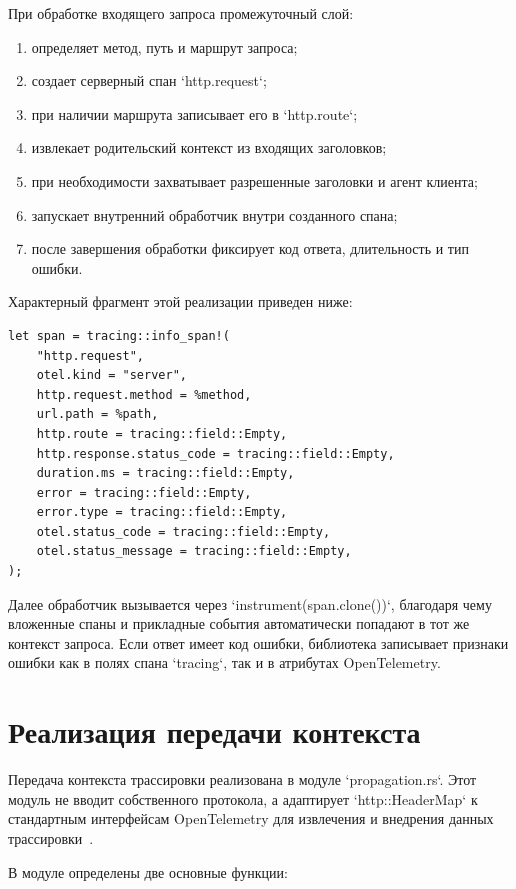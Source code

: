 При обработке входящего запроса промежуточный слой:
\begin{enumerate}
    \item определяет метод, путь и маршрут запроса;
    \item создает серверный спан `http.request`;
    \item при наличии маршрута записывает его в `http.route`;
    \item извлекает родительский контекст из входящих заголовков;
    \item при необходимости захватывает разрешенные заголовки и агент клиента;
    \item запускает внутренний обработчик внутри созданного спана;
    \item после завершения обработки фиксирует код ответа, длительность и тип
    ошибки.
\end{enumerate}

Характерный фрагмент этой реализации приведен ниже:

\begin{verbatim}
let span = tracing::info_span!(
    "http.request",
    otel.kind = "server",
    http.request.method = %method,
    url.path = %path,
    http.route = tracing::field::Empty,
    http.response.status_code = tracing::field::Empty,
    duration.ms = tracing::field::Empty,
    error = tracing::field::Empty,
    error.type = tracing::field::Empty,
    otel.status_code = tracing::field::Empty,
    otel.status_message = tracing::field::Empty,
);
\end{verbatim}

Далее обработчик вызывается через `instrument(span.clone())`, благодаря чему
вложенные спаны и прикладные события автоматически попадают в тот же контекст
запроса. Если ответ имеет код ошибки, библиотека записывает признаки ошибки как
в полях спана `tracing`, так и в атрибутах OpenTelemetry.

\section{Реализация передачи контекста}

Передача контекста трассировки реализована в модуле `propagation.rs`. Этот
модуль не вводит собственного протокола, а адаптирует `http::HeaderMap` к
стандартным интерфейсам OpenTelemetry для извлечения и внедрения данных
трассировки~\cite{w3cTraceContext,opentelemetryPropagationDocs}.

В модуле определены две основные функции:

